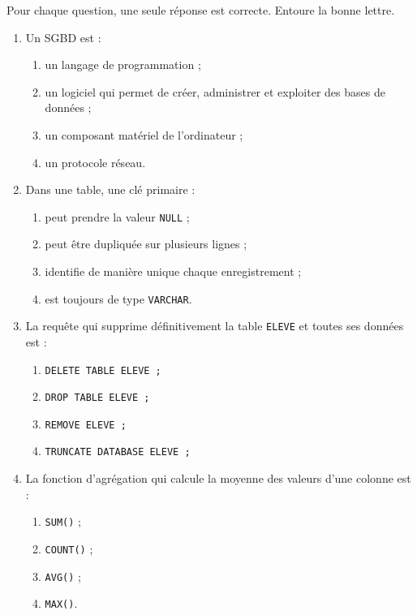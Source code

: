 \documentclass[11pt]{article}
\begin{document}
\begin{exercice}
Pour chaque question, une seule réponse est correcte. Entoure la bonne lettre.
\begin{enumerate}
\item Un SGBD est :
\begin{enumerate}
\item un langage de programmation ;
\item un logiciel qui permet de créer, administrer et exploiter des bases de données ;
\item un composant matériel de l'ordinateur ;
\item un protocole réseau.
\end{enumerate}
\item Dans une table, une clé primaire :
\begin{enumerate}
\item peut prendre la valeur \texttt{NULL} ;
\item peut être dupliquée sur plusieurs lignes ;
\item identifie de manière unique chaque enregistrement ;
\item est toujours de type \texttt{VARCHAR}.
\end{enumerate}
\item La requête qui supprime définitivement la table \texttt{ELEVE} et toutes ses données est :
\begin{enumerate}
\item \texttt{DELETE TABLE ELEVE ;}
\item \texttt{DROP TABLE ELEVE ;}
\item \texttt{REMOVE ELEVE ;}
\item \texttt{TRUNCATE DATABASE ELEVE ;}
\end{enumerate}
\item La fonction d'agrégation qui calcule la moyenne des valeurs d'une colonne est :
\begin{enumerate}
\item \texttt{SUM()} ;
\item \texttt{COUNT()} ;
\item \texttt{AVG()} ;
\item \texttt{MAX()}.
\end{enumerate}
\end{enumerate}
\end{exercice}
\end{document}
